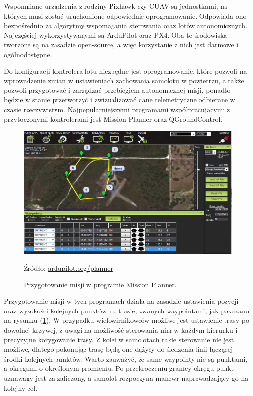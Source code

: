 \documentclass[12pt, a4paper]{article}
\let\oldref\ref
\renewcommand{\ref}[1]{(\oldref{#1})}
\begin{document}
Wspomniane urządzenia z rodziny Pixhawk czy CUAV są jednostkami, na których musi zostać uruchomione odpowiednie oprogramowanie. Odpowiada ono bezpośrednio za algorytmy wspomagania sterowania oraz lotów autonomicznych. Najczęściej wykorzystywanymi są ArduPilot oraz PX4. Oba te środowiska tworzone są na zasadzie open-source, a więc korzystanie z nich jest darmowe i ogólnodostępne. 

Do konfiguracji kontrolera lotu niezbędne jest oprogramowanie, które pozwoli na wprowadzenie zmian w ustawieniach zachowania samolotu w powietrzu, a także pozwoli przygotować i zarządzać przebiegiem autonomicznej misji, ponadto będzie w stanie przetworzyć i zwizualizować dane telemetryczne odbierane w czasie rzeczywistym. Najpopularniejszymi programami współpracującymi z przytoczonymi kontrolerami jest Mission Planner oraz QGroundControl.

\begin{figure}[ht]
    \centering
    \includegraphics[width=1\textwidth]{missionplanner}
    \caption{Przygotowanie misji w programie Mission Planner.}
    \small Źródło: \url{ardupilot.org/planner}
    \label{fig:missionplanner}
\end{figure}

Przygotowanie misji w tych programach działa na zasadzie ustawienia pozycji oraz wysokości kolejnych punktów na trasie, zwanych waypointami, jak pokazano na rysunku \ref{fig:missionplanner}. W przypadku wielowirnikowców możliwe jest ustawienie trasy po dowolnej krzywej, z uwagi na możliwość sterowania nim w każdym kierunku i precyzyjne korygowanie trasy. Z kolei w samolotach takie sterowanie nie jest możliwe, dlatego pokonując trasę będą one dążyły do śledzenia linii łączącej środki kolejnych punktów. Warto zauważyć, że same waypointy nie są punktami, a okręgami o określonym promieniu. Po przekroczeniu granicy okręgu punkt uznawany jest za zaliczony, a samolot rozpoczyna manewr naprowadzający go na kolejny cel.
\FloatBarrier
\end{document}
